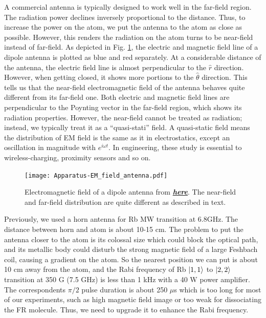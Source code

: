 A commercial antenna is typically designed to work well in the far-field region. The radiation power declines inversely proportional to the distance. Thus, to increase the power on the atom, we put the antenna to the atom as close as possible. However, this renders the radiation on the atom turns to be near-field instead of far-field. As depicted in Fig. \ref{antenna_EM}, the electric and magnetic field line of a dipole antenna is plotted as blue and red separately. At a considerable distance of the antenna, the electric field line is almost perpendicular to the \(\hat{r}\) direction. However, when getting closed, it shows more portions to the \(\hat{\theta}\) direction. This tells us that the near-field electromagnetic field of the antenna behaves quite different from its far-field one. Both electric and magnetic field lines are perpendicular to the Poynting vector in the far-field region, which shows its radiation properties. However, the near-field cannot be treated as radiation; instead, we typically treat it as a ``quasi-stati'' field. A quasi-static field means the distribution of EM field is the same as it in electrostatics, except an oscillation in magnitude with \(e^{i\omega t}\). In engineering, these study is essential to wireless-charging, proximity sensors and so on.

\begin{figure}[htb]
\begin{center}
\texttt{[image: Apparatus-EM\_field\_antenna.pdf]}
\end{center}
\caption[Electromagnetic field of a dipole antenna]{Electromagnetic field of a dipole antenna from \href{https://www.everythingrf.com/community/what-is-the-difference-between-a-monopole-and-dipole-antenna}{\textit{\textbf{here}}}. The near-field and far-field distribution are quite different as described in text.}  
\label{antenna_EM}
\end{figure}

Previously, we used a horn antenna for Rb MW transition at 6.8GHz. The distance between horn and atom is about 10-15 cm. The problem to put the antenna closer to the atom is its colossal size which could block the optical path, and its metallic body could disturb the strong magnetic field of a large Feshbach coil, causing a gradient on the atom. So the nearest position we can put is about 10 cm away from the atom, and the Rabi frequency of Rb $\ket{1,1}$ to $\ket{2,2}$ transition at 350 G (7.5 GHz) is less than 1 kHz with a 40 W power amplifier. The correspondents \(\pi/2\) pulse duration is about 250 $\mu$s which is too long for most of our experiments, such as high magnetic field image or too weak for dissociating the FR molecule. Thus, we need to upgrade it to enhance the Rabi frequency.


